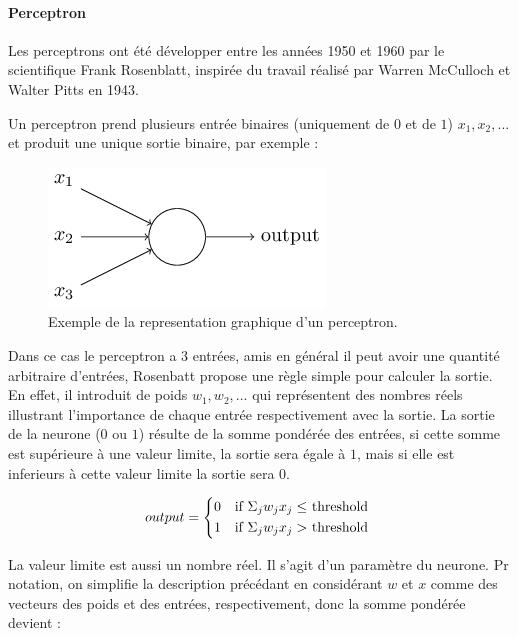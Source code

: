 \documentclass[conference,onecolumn]{IEEEtran}
\begin{document}
\paragraph{Perceptron}
Les perceptrons ont été développer entre les années 1950 et 1960 par le scientifique Frank Rosenblatt, inspirée du travail réalisé par Warren McCulloch et Walter Pitts en 1943. 

Un perceptron prend plusieurs entrée binaires (uniquement de $0$ et de $1$) $x_1, x_2, ...$ et produit une unique sortie binaire, par exemple : 

 \begin{figure}[H]
 \centering
    \includegraphics[scale=0.5]{img9.png}
    \caption{Exemple de la representation graphique d’un perceptron.}
\end{figure}

Dans ce cas le perceptron a 3 entrées, amis en général il peut avoir une quantité arbitraire d’entrées, Rosenbatt propose une règle simple pour calculer la sortie. En effet, il introduit de poids $w_1, w_2, ...$ qui représentent des nombres réels illustrant l’importance de chaque entrée respectivement avec la sortie. La sortie de la neurone ($0$ ou $1$)  résulte de la somme pondérée des entrées, si cette somme est supérieure à une valeur limite, la sortie sera égale à $1$, mais si elle est inferieurs à cette valeur limite la sortie sera $0$. 

\begin{equation}
    output =
    \begin{cases*}
      0 & if $\Sigma_j w_jx_j \leq $ threshold \\
      1 & if $\Sigma_j w_jx_j > $ threshold \\
    \end{cases*}
\end{equation}

La valeur limite est aussi un nombre réel. Il s’agit d’un paramètre du neurone. Pr notation, on simplifie la description précédant en considérant $w$ et $x$ comme des vecteurs des poids et des entrées, respectivement, donc la somme pondérée devient : 
\end{document}
